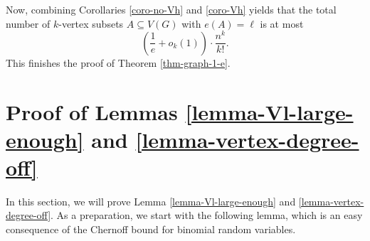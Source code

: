 \documentclass[11pt]{article}
\theoremstyle{definition}
\numberwithin{equation}{section}
\begin{document}
Now, combining Corollaries \ref{coro-no-Vh} and \ref{coro-Vh} yields that the total number of $k$-vertex subsets $A\subseteq V(G)$ with $e(A)=\ell$ is at most
\[\left(\frac{1}{e}+o_k(1)\right)\cdot \frac{n^k}{k!}.\]
This finishes the proof of Theorem \ref{thm-graph-1-e}.

\section{Proof of Lemmas \ref{lemma-Vl-large-enough} and \ref{lemma-vertex-degree-off}}\label{sect-proofs-two-lemmas}

In this section, we will prove Lemma \ref{lemma-Vl-large-enough} and \ref{lemma-vertex-degree-off}. As a preparation, we start with the following lemma, which is an easy consequence of the Chernoff bound for binomial random variables.
\end{document}
